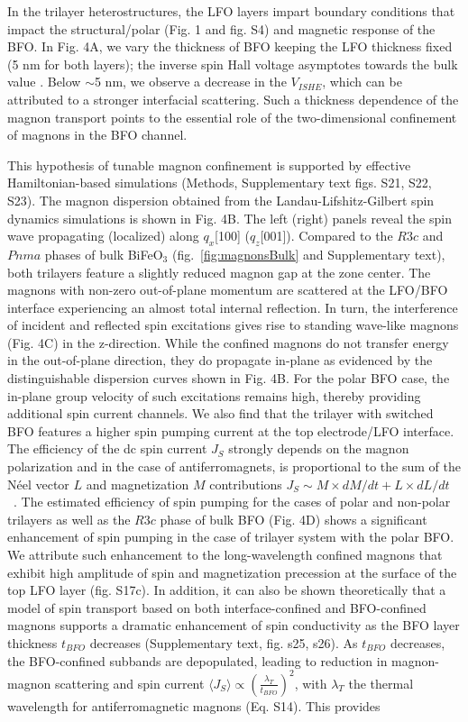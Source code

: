\documentclass[12pt]{article}
\begin{document}
In the trilayer heterostructures, the LFO layers impart boundary conditions that impact the structural/polar (Fig. 1 and fig. S4) and magnetic response of the BFO\cite{Nicola2012noncollinear,carcan2017phase}. In Fig. 4A, we vary the thickness of BFO keeping the LFO thickness fixed (5 nm for both layers);  the inverse spin Hall voltage asymptotes towards the bulk value \cite{parsonnet2022nonvolatile,husain2024non,huang2024manipulating}. Below $\sim$5 nm, we observe a decrease in the $V_{ISHE}$, which can be attributed to a stronger interfacial scattering.  Such a thickness dependence of the magnon transport points to the essential role of the two-dimensional confinement of magnons in the BFO channel. 

This hypothesis of tunable magnon confinement is supported by effective Hamiltonian-based simulations (Methods, Supplementary text figs. S21, S22, S23). The magnon dispersion obtained from the Landau-Lifshitz-Gilbert spin dynamics simulations\cite{wang2012atomistic} is shown in Fig. 4B. The left (right) panels reveal the spin wave propagating (localized) along $q_x$[100] ($q_z$[001]). Compared to the $R3c$ and $Pnma$ phases of bulk BiFeO$_3$ (fig.~\ref{fig:magnonsBulk} and Supplementary text), both trilayers feature a slightly reduced magnon gap at the zone center. The magnons with non-zero out-of-plane momentum are scattered at the LFO/BFO interface experiencing an almost total internal reflection. In turn, the interference of incident and reflected spin excitations gives rise to standing wave-like magnons (Fig. 4C) in the z-direction. While the confined magnons do not transfer energy in the out-of-plane direction, they do propagate in-plane as evidenced by the distinguishable dispersion curves shown in Fig. 4B. For the polar BFO case, the in-plane group velocity of such excitations remains high, thereby providing additional spin current channels. We also find that the trilayer with switched BFO features a higher spin pumping current at the top electrode/LFO interface. The efficiency of the dc spin current $J_S$ strongly depends on the magnon polarization and in the case of antiferromagnets, is proportional to the sum of the Néel vector $L$ and magnetization $M$ contributions $J_S \sim M \times dM/dt + L \times dL/dt$ ~\cite{cheng2014}. The estimated efficiency of spin pumping for the cases of polar and non-polar trilayers as well as the $R3c$ phase of bulk BFO (Fig. 4D) shows a significant enhancement of spin pumping in the case of trilayer system with the polar BFO. We attribute such enhancement to the long-wavelength confined magnons that exhibit high amplitude of spin and magnetization precession at the surface of the top LFO layer (fig. S17c). In addition, it can also be shown theoretically that a model of spin transport based on both interface-confined and BFO-confined magnons supports a dramatic enhancement of spin conductivity as the BFO layer thickness $t_{BFO}$ decreases (Supplementary text, fig. s25, s26). As  $t_{BFO}$ decreases, the BFO-confined subbands are depopulated, leading to reduction in magnon-magnon scattering and spin current $\langle J_S\rangle \propto \left(\frac{\lambda_T}{t_{BFO}}\right)^{2}$, with $\lambda_T$ the thermal wavelength for antiferromagnetic magnons (Eq. S14). This provides 
\end{document}
